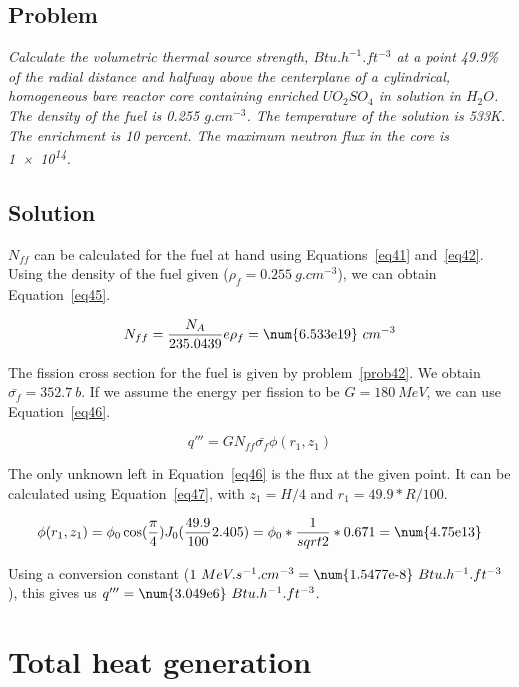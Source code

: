 \subsection{Problem}
\textit{Calculate the volumetric thermal source strength, $Btu.h^{-1}.ft^{-3}$ at a point 49.9\% of the radial distance and halfway above the centerplane of a cylindrical, homogeneous bare reactor core containing enriched $UO_2SO_4$ in solution in $H_2O$. The density of the fuel is 0.255 $g.cm^{-3}$. The temperature of the solution is 533K. The enrichment is 10 percent. The maximum neutron flux in the core is \num{1e14}.}

\subsection{Solution}

$N_{ff}$ can be calculated for the fuel at hand using Equations~\ref{eq41} and~\ref{eq42}. Using the density of the fuel given ($\rho_f = 0.255\ g.cm^{-3}$), we can obtain Equation~\ref{eq45}.

\begin{equation}\label{eq45}
N_{ff} = \frac{N_A}{235.0439}e\rho_{f} = \text{\num{6.533e19}}\ cm^{-3}
\end{equation}

The fission cross section for the fuel is given by problem~\ref{prob42}. We obtain $\bar{\sigma_{f}} = 352.7\ b$. If we assume the energy per fission to be $G = 180\ MeV$, we can use Equation~\ref{eq46}.

\begin{equation}\label{eq46}
q''' = G N_{ff} \bar{\sigma_{f}} \phi(r_1, z_1)
\end{equation}

The only unknown left in Equation~\ref{eq46} is the flux at the given point. It can be calculated using Equation~\ref{eq47}, with $z_1 = H/4$ and $r_1 = 49.9*R/100$.

\begin{equation}\label{eq47}
\phi(r_1, z_1) = \phi_0 \cos(\frac{\pi}{4}) J_0(\frac{49.9}{100}2.405) = \phi_0 * \frac{1}{sqrt{2}} * 0.671 = \text{\num{4.75e13}}
\end{equation}

Using a conversion constant ($1\ MeV.s^{-1}.cm^{-3} = \text{\num{1.5477e-8}}\ Btu.h^{-1}.ft^{-3}$), this gives us $q''' = \text{\num{3.049e6}}\ Btu.h^{-1}.ft^{-3}$.



\section{Total heat generation}
\label{prob44}


